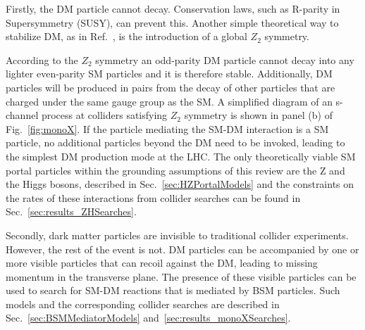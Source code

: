 Firstly, the DM particle cannot decay. Conservation laws, such as R-parity in Supersymmetry (SUSY), can prevent this. Another simple theoretical way to stabilize DM, as in Ref.~\cite{Batell:2010bp}, is the introduction of a global $Z_2$ symmetry. 
\begin{marginnote}[]
\end{marginnote}
According to the $Z_2$ symmetry an odd-parity DM particle cannot decay into any lighter even-parity SM particles and it is therefore stable. 
Additionally, DM particles will be produced in pairs from the decay of other particles that are charged under the same gauge group as the SM.
A simplified diagram of an s-channel process at colliders satisfying $Z_2$ symmetry is shown in panel (b) of Fig.~\ref{fig:monoX}.
If the particle mediating the SM-DM interaction is a SM particle, no additional particles beyond the DM need to be invoked, leading to the simplest DM production mode at the LHC. The only theoretically viable SM portal particles within the grounding assumptions of this review are the Z and the Higgs bosons, described in Sec.~\ref{sec:HZPortalModels} and the constraints on the rates of these interactions from collider searches can be found in Sec.~\ref{sec:results_ZHSearches}. 

Secondly, dark matter particles are invisible to traditional collider experiments. However, the rest of the event is not. DM particles can be accompanied by one or more visible particles that can recoil against the DM, leading to missing momentum in the transverse plane. The presence of these visible particles can be used to search for SM-DM reactions that is mediated by BSM particles. Such models and the corresponding collider searches are described in Sec.~\ref{sec:BSMMediatorModels} and~\ref{sec:results_monoXSearches}. 

\begin{marginnote}[]
\end{marginnote}

